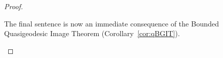 \documentclass[10pt,a4paper]{amsart}
\begin{document}
\begin{proof}
\begin{enumerate}
    The final sentence is now an immediate consequence of the Bounded
    Quasigeodesic Image Theorem (Corollary~\ref{cor:qBGIT}).
  \end{enumerate}
\end{proof}
\end{document}
